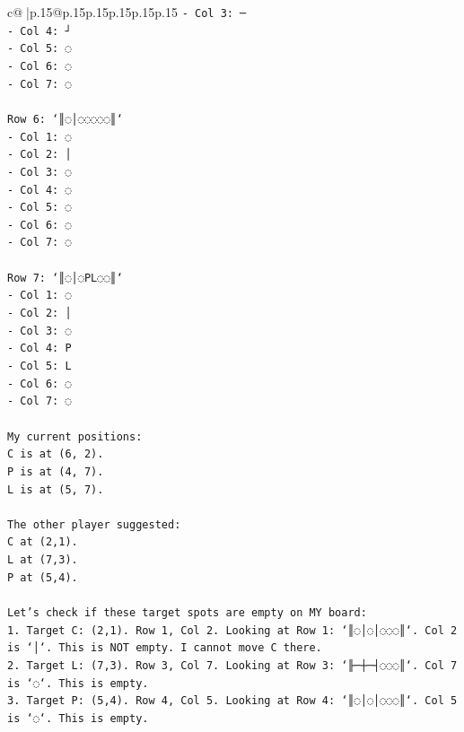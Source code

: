 \documentclass{article}
\begin{document}
{\begin{supertabular}{c@{$\;$}|p{.15\linewidth}@{}p{.15\linewidth}p{.15\linewidth}p{.15\linewidth}p{.15\linewidth}p{.15\linewidth}}
{{{\texttt{{-} Col 3: ─} \\
\texttt{{-} Col 4: ┘} \\
\texttt{{-} Col 5: ◌} \\
\texttt{{-} Col 6: ◌} \\
\texttt{{-} Col 7: ◌} \\
\\ 
\texttt{Row 6: `║◌│◌◌◌◌◌║`} \\
\texttt{{-} Col 1: ◌} \\
\texttt{{-} Col 2: │} \\
\texttt{{-} Col 3: ◌} \\
\texttt{{-} Col 4: ◌} \\
\texttt{{-} Col 5: ◌} \\
\texttt{{-} Col 6: ◌} \\
\texttt{{-} Col 7: ◌} \\
\\ 
\texttt{Row 7: `║◌│◌PL◌◌║`} \\
\texttt{{-} Col 1: ◌} \\
\texttt{{-} Col 2: │} \\
\texttt{{-} Col 3: ◌} \\
\texttt{{-} Col 4: P} \\
\texttt{{-} Col 5: L} \\
\texttt{{-} Col 6: ◌} \\
\texttt{{-} Col 7: ◌} \\
\\ 
\texttt{My current positions:} \\
\texttt{C is at (6, 2).} \\
\texttt{P is at (4, 7).} \\
\texttt{L is at (5, 7).} \\
\\ 
\texttt{The other player suggested:} \\
\texttt{C at (2,1).} \\
\texttt{L at (7,3).} \\
\texttt{P at (5,4).} \\
\\ 
\texttt{Let's check if these target spots are empty on MY board:} \\
\texttt{1. Target C: (2,1). Row 1, Col 2. Looking at Row 1: `║◌│◌│◌◌◌║`. Col 2 is `│`. This is NOT empty. I cannot move C there.} \\
\texttt{2. Target L: (7,3). Row 3, Col 7. Looking at Row 3: `╟─┼─┤◌◌◌║`. Col 7 is `◌`. This is empty.} \\
\texttt{3. Target P: (5,4). Row 4, Col 5. Looking at Row 4: `║◌│◌│◌◌◌║`. Col 5 is `◌`. This is empty.} \\
}}}
\end{supertabular}}
\end{document}
